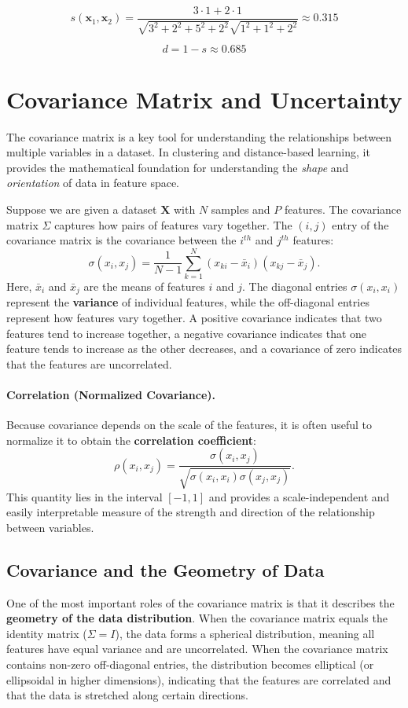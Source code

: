 \documentclass{article}
\begin{document}
\[
s(\mathbf{x}_1,\mathbf{x}_2)=
\frac{3\cdot1+2\cdot1}{\sqrt{3^2+2^2+5^2+2^2}\sqrt{1^2+1^2+2^2}}
\approx 0.315
\]

\[
d=1-s\approx 0.685
\]


\section{Covariance Matrix and Uncertainty}

The covariance matrix is a key tool for understanding the relationships between 
multiple variables in a dataset. In clustering and distance-based learning, it 
provides the mathematical foundation for understanding the \textit{shape} and 
\textit{orientation} of data in feature space.

Suppose we are given a dataset $\mathbf{X}$ with $N$ samples and $P$ features. 
The covariance matrix $\Sigma$ captures how pairs of features vary together. 
The $(i,j)$ entry of the covariance matrix is the covariance between the 
$i^{th}$ and $j^{th}$ features:
\[
\sigma(x_i, x_j) = \frac{1}{N-1} \sum_{k=1}^{N} (x_{ki} - \bar{x}_i)(x_{kj} - \bar{x}_j).
\]
Here, $\bar{x}_i$ and $\bar{x}_j$ are the means of features $i$ and $j$.  
The diagonal entries $\sigma(x_i,x_i)$ represent the \textbf{variance} of 
individual features, while the off-diagonal entries represent how features vary 
together. A positive covariance indicates that two features tend to increase 
together, a negative covariance indicates that one feature tends to increase as 
the other decreases, and a covariance of zero indicates that the features are 
uncorrelated.

\paragraph{Correlation (Normalized Covariance).}
Because covariance depends on the scale of the features, it is often useful to 
normalize it to obtain the \textbf{correlation coefficient}:
\[
\rho(x_i,x_j)=\frac{\sigma(x_i,x_j)}
{\sqrt{\sigma(x_i,x_i)\sigma(x_j,x_j)}}.
\]
This quantity lies in the interval $[-1,1]$ and provides a scale-independent and 
easily interpretable measure of the strength and direction of the relationship 
between variables.

\subsection*{Covariance and the Geometry of Data}

One of the most important roles of the covariance matrix is that it describes the 
\textbf{geometry of the data distribution}. When the covariance matrix equals the 
identity matrix ($\Sigma = I$), the data forms a spherical distribution, meaning all features have equal variance and are uncorrelated.
When the covariance matrix 
contains non-zero off-diagonal entries, the distribution becomes elliptical (or 
ellipsoidal in higher dimensions), indicating that the features are correlated 
and that the data is stretched along certain directions.
\end{document}
